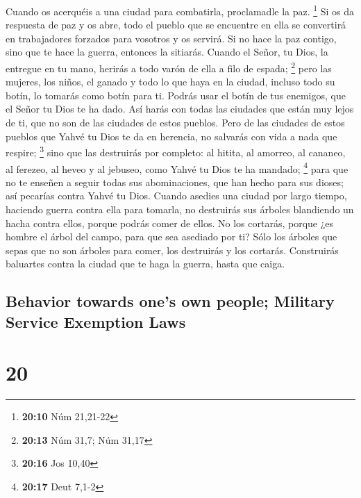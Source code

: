 \begin{paracol}{2}
 Cuando os acerquéis a una ciudad para combatirla,
proclamadle la paz. \footnote{\textbf{20:10} Núm 21,21-22}
 Si os da respuesta de paz y os abre, todo el pueblo que
se encuentre en ella se convertirá en trabajadores forzados para
vosotros y os servirá.  Si no hace la paz contigo, sino
que te hace la guerra, entonces la sitiarás.  Cuando el
Señor, tu Dios, la entregue en tu mano, herirás a todo varón de ella a
filo de espada; \footnote{\textbf{20:13} Núm 31,7; Núm 31,17}
 pero las mujeres, los niños, el ganado y todo lo que
haya en la ciudad, incluso todo su botín, lo tomarás como botín para ti.
Podrás usar el botín de tus enemigos, que el Señor tu Dios te ha dado.
 Así harás con todas las ciudades que están muy lejos de
ti, que no son de las ciudades de estos pueblos.  Pero de
las ciudades de estos pueblos que Yahvé tu Dios te da en herencia, no
salvarás con vida a nada que respire; \footnote{\textbf{20:16} Jos 10,40}
 sino que las destruirás por completo: al hitita, al
amorreo, al cananeo, al ferezeo, al heveo y al jebuseo, como Yahvé tu
Dios te ha mandado; \footnote{\textbf{20:17} Deut 7,1-2} 
para que no te enseñen a seguir todas sus abominaciones, que han hecho
para sus dioses; así pecarías contra Yahvé tu Dios. 
Cuando asedies una ciudad por largo tiempo, haciendo guerra contra ella
para tomarla, no destruirás sus árboles blandiendo un hacha contra
ellos, porque podrás comer de ellos. No los cortarás, porque ¿es hombre
el árbol del campo, para que sea asediado por ti?  Sólo
los árboles que sepas que no son árboles para comer, los destruirás y
los cortarás. Construirás baluartes contra la ciudad que te haga la
guerra, hasta que caiga.

\switchcolumn
\begin{otherlanguage}{english}

\hypertarget{behavior-towards-ones-own-people-military-service-exemption-laws}{%
\subsection{Behavior towards one's own people; Military Service
Exemption
Laws}\label{behavior-towards-ones-own-people-military-service-exemption-laws}}

\hypertarget{section-39}{%
\section{20}\label{section-39}}


\end{otherlanguage}
\end{paracol}
